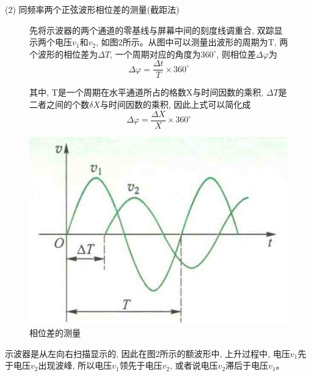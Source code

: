 \documentclass[10pt, a4paper]{article} %
\begin{document}
(2) 同频率两个正弦波形相位差的测量(截距法)
\begin{figure}[ht]
    \centering
    \begin{minipage}[ht]{0.6\textwidth} %
        先将示波器的两个通道的零基线与屏幕中间的刻度线调重合, 双踪显示两个电压\(v_1\)和\(v_2\), 如图2所示。从图中可以测量出波形的周期为T, 两个波形的相位差为\(\Delta T\), 一个周期对应的角度为\(360^{\circ}\), 则相位差\(\Delta \varphi\)为
        $$
        \Delta \varphi = \frac{\Delta t}{T} \times 360^{\circ}
        $$
        
        其中, T是一个周期在水平通道所占的格数X与时间因数的乘积, \(\Delta T\)是二者之间的个数$\delta X$与时间因数的乘积, 因此上式可以简化成
        $$
        \Delta \varphi = \frac{\Delta X}{X} \times 360^{\circ}
        $$
    \end{minipage}%
    \hfill %
    \begin{minipage}[ht]{0.35\textwidth} %
        \centering
        \includegraphics[width=\linewidth]{image/2.png} %
        \caption{相位差的测量}
        \label{fig:side:b}
    \end{minipage}
    \end{figure}

示波器是从左向右扫描显示的, 因此在图2所示的额波形中, 上升过程中, 电压\(v_1\)先于电压\(v_2\)出现波峰, 所以电压\(v_1\)领先于电压\(v_2\), 或者说电压\(v_2\)滞后于电压\(v_1\)。
\end{document}

